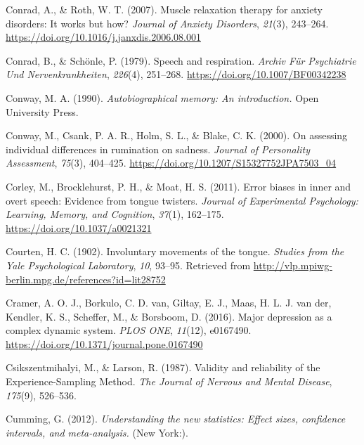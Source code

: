 \documentclass[a4paper,12pt,twoside,onecolumn,openright,final,oldfontcommands]{memoir}
\begin{document}
\leavevmode\hypertarget{ref-conrad_muscle_2007}{}%
Conrad, A., \& Roth, W. T. (2007). Muscle relaxation therapy for anxiety disorders: It works but how? \emph{Journal of Anxiety Disorders}, \emph{21}(3), 243--264. \url{https://doi.org/10.1016/j.janxdis.2006.08.001}

\leavevmode\hypertarget{ref-conrad_speech_1979}{}%
Conrad, B., \& Schönle, P. (1979). Speech and respiration. \emph{Archiv Für Psychiatrie Und Nervenkrankheiten}, \emph{226}(4), 251--268. \url{https://doi.org/10.1007/BF00342238}

\leavevmode\hypertarget{ref-conway_autobiographical_1990}{}%
Conway, M. A. (1990). \emph{Autobiographical memory: An introduction.} Open University Press.

\leavevmode\hypertarget{ref-conway_assessing_2000}{}%
Conway, M., Csank, P. A. R., Holm, S. L., \& Blake, C. K. (2000). On assessing individual differences in rumination on sadness. \emph{Journal of Personality Assessment}, \emph{75}(3), 404--425. \url{https://doi.org/10.1207/S15327752JPA7503_04}

\leavevmode\hypertarget{ref-corley_error_2011}{}%
Corley, M., Brocklehurst, P. H., \& Moat, H. S. (2011). Error biases in inner and overt speech: Evidence from tongue twisters. \emph{Journal of Experimental Psychology: Learning, Memory, and Cognition}, \emph{37}(1), 162--175. \url{https://doi.org/10.1037/a0021321}

\leavevmode\hypertarget{ref-courten_involuntary_1902}{}%
Courten, H. C. (1902). Involuntary movements of the tongue. \emph{Studies from the Yale Psychological Laboratory}, \emph{10}, 93--95. Retrieved from \url{http://vlp.mpiwg-berlin.mpg.de/references?id=lit28752}

\leavevmode\hypertarget{ref-cramer_major_2016}{}%
Cramer, A. O. J., Borkulo, C. D. van, Giltay, E. J., Maas, H. L. J. van der, Kendler, K. S., Scheffer, M., \& Borsboom, D. (2016). Major depression as a complex dynamic system. \emph{PLOS ONE}, \emph{11}(12), e0167490. \url{https://doi.org/10.1371/journal.pone.0167490}

\leavevmode\hypertarget{ref-csikszentmihalyi_validity_1987}{}%
Csikszentmihalyi, M., \& Larson, R. (1987). Validity and reliability of the Experience-Sampling Method. \emph{The Journal of Nervous and Mental Disease}, \emph{175}(9), 526--536.

\leavevmode\hypertarget{ref-Cumming2012}{}%
Cumming, G. (2012). \emph{Understanding the new statistics: Effect sizes, confidence intervals, and meta-analysis.} (New York:).
\end{document}
